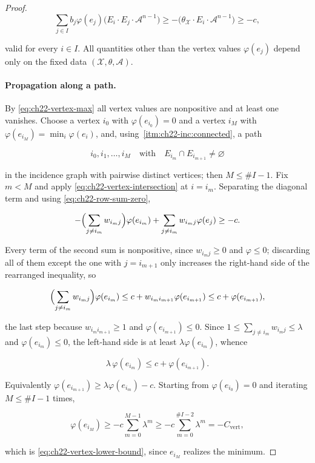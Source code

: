 \begin{proof}
\[
 \sum_{j\in I} b_j\varphi(e_j)
       \bigl(E_i\cdot E_j\cdot\mathcal A^{n-1}\bigr)
 \geq
 -\bigl(\theta_{\mathcal X}\cdot E_i\cdot\mathcal A^{n-1}\bigr)
 \geq-c,
\tag{22.28}\label{eq:ch22-vertex-intersection}
\]

valid for every $i\in I$.  All quantities other than the vertex values
$\varphi(e_j)$ depend only on the fixed data
$(\mathcal X,\theta,\mathcal A)$.

\paragraph{Propagation along a path.}
By \eqref{eq:ch22-vertex-max} all vertex values are nonpositive and at least
one vanishes.  Choose a vertex $i_0$ with $\varphi(e_{i_0})=0$ and a
vertex $i_M$ with $\varphi(e_{i_M})=\min_i\varphi(e_i)$, and, using
\,\cref{itm:ch22-inc:connected}, a path

\[
             i_0,i_1,\ldots,i_M
             \quad\text{with}\quad
             E_{i_m}\cap E_{i_{m+1}}\neq\varnothing
\tag{22.29}\label{eq:ch22-vertex-path}
\]

in the incidence graph with pairwise distinct vertices; then
$M\leq\#I-1$.  Fix $m<M$ and apply
\eqref{eq:ch22-vertex-intersection} at $i=i_m$.  Separating the diagonal
term and using \eqref{eq:ch22-row-sum-zero},

\[
 -\Bigl(\sum_{j\neq i_m}w_{i_mj}\Bigr)\varphi(e_{i_m})
 +\sum_{j\neq i_m}w_{i_mj}\varphi(e_j)\geq-c .
\]

Every term of the second sum is nonpositive, since $w_{i_mj}\geq0$ and
$\varphi\leq0$; discarding all of them except the one with
$j=i_{m+1}$ only increases the right-hand side of the rearranged
inequality, so

\[
 \Bigl(\sum_{j\neq i_m}w_{i_mj}\Bigr)\varphi(e_{i_m})
 \leq c+w_{i_mi_{m+1}}\varphi(e_{i_{m+1}})
 \leq c+\varphi(e_{i_{m+1}}),
\]

the last step because $w_{i_mi_{m+1}}\geq1$ and
$\varphi(e_{i_{m+1}})\leq0$.  Since
$1\leq\sum_{j\neq i_m}w_{i_mj}\leq\lambda$ and
$\varphi(e_{i_m})\leq0$, the left-hand side is at least
$\lambda\varphi(e_{i_m})$, whence

\[
               \lambda\,\varphi(e_{i_m})
               \leq c+\varphi(e_{i_{m+1}}).
\tag{22.30}\label{eq:ch22-path-recursion}
\]

Equivalently $\varphi(e_{i_{m+1}})\geq\lambda\varphi(e_{i_m})-c$.
Starting from $\varphi(e_{i_0})=0$ and iterating $M\leq\#I-1$ times,

\[
 \varphi(e_{i_M})
 \geq-c\sum_{m=0}^{M-1}\lambda^m
 \geq-c\sum_{m=0}^{\#I-2}\lambda^m
 =-C_{\mathrm{vert}} ,
\]

which is \eqref{eq:ch22-vertex-lower-bound}, since $e_{i_M}$ realizes the
minimum.
\end{proof}

